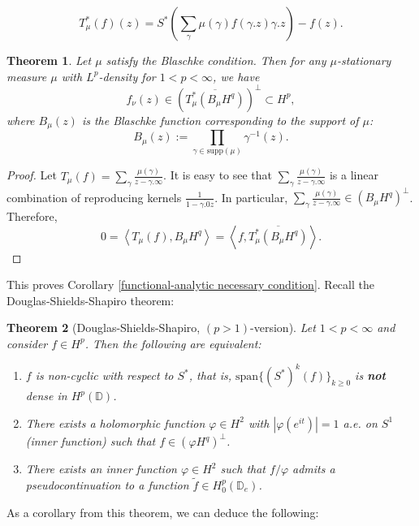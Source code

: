 \documentclass[11pt]{article}
\newtheorem{theorem}{Theorem}[section]
\begin{document}
\begin{equation}
	\label{adjoint of LHS}
	T_\mu^*(f)(z) = S^*\left( \sum_{\gamma} \mu(\gamma) f(\gamma.z) \gamma.z\right)  - f(z).
\end{equation}

\begin{theorem}
	Let $\mu$ satisfy the Blaschke condition. Then for any $\mu$-stationary measure $\mu$ with $L^p$-density for $1 < p < \infty$, we have
	\[
	f_\nu(z) \in (\overline{T_\mu^*(B_\mu H^q)})^{\perp} \subset H^p,
	\]
	where $B_\mu(z)$ is the Blaschke function corresponding to the support of $\mu$:
	\[
	B_\mu(z) := \prod_{\gamma \in \text{supp}(\mu)} \gamma^{-1}(z).
	\]
\end{theorem}

\begin{proof}
	Let $T_\mu(f) = \sum_{\gamma} \frac{\mu(\gamma)}{z - \gamma.\infty}$. It is easy to see that $\sum_{\gamma} \frac{\mu(\gamma)}{z - \gamma.\infty}$ is a linear combination of reproducing kernels $\frac{1}{1 - \overline{\gamma.0}z}$. In particular, $\sum_{\gamma} \frac{\mu(\gamma)}{z - \gamma.\infty} \in (B_\mu H^q)^\perp$. Therefore,
	\[
	0 = \left\langle T_\mu(f), B_\mu H^q \right\rangle = \left\langle f, \overline{T_\mu^*(B_\mu H^q)} \right\rangle.
	\]
\end{proof}

This proves Corollary \ref{functional-analytic necessary condition}. Recall the Douglas-Shields-Shapiro theorem:

\begin{theorem}[Douglas-Shields-Shapiro, $(p>1)$-version]
	Let $1 < p < \infty$ and consider $f \in H^p$. Then the following are equivalent:
	\begin{enumerate}
		\item $f$ is non-cyclic with respect to $S^*$, that is, $
		\text{span}\{ (S^*)^k(f) \}_{k \ge 0}$ is \textbf{not} dense in $H^p(\mathbb{D})$.
		\item There exists a holomorphic function $\varphi \in H^2$ with $|\varphi(e^{it})| = 1$ a.e. on $S^1$ (inner function) such that $f \in (\varphi H^q)^\perp$.
		\item There exists an inner function $\varphi \in H^2$ such that $f / \varphi$ admits a pseudocontinuation to a function $\tilde{f} \in H^p_0(\mathbb{D}_e)$.
	\end{enumerate} 
\end{theorem}

As a corollary from this theorem, we can deduce the following:
\end{document}
